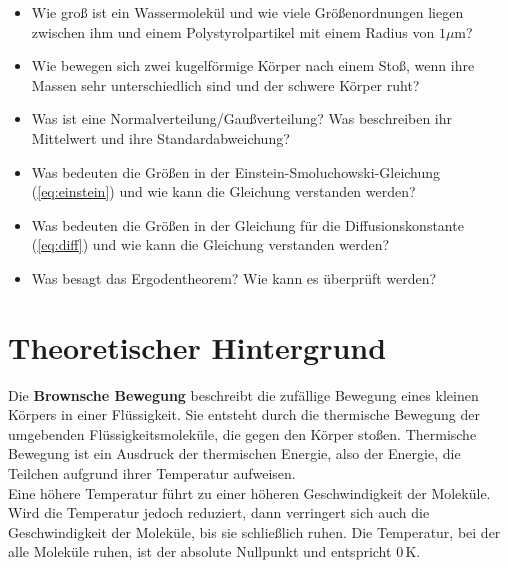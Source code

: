 \documentclass[a4paper, 12pt]{scrartcl}
\begin{document}
\begin{itemize}
  \item Wie groß ist ein Wassermolekül und wie viele Größenordnungen liegen zwischen ihm und einem Polystyrolpartikel mit einem Radius von $1 \mu$m?
  \item Wie bewegen sich zwei kugelförmige Körper nach einem Stoß, wenn ihre Massen sehr unterschiedlich sind und der schwere Körper ruht?
  \item Was ist eine Normalverteilung/Gaußverteilung? Was beschreiben ihr Mittelwert und ihre Standardabweichung?
  \item Was bedeuten die Größen in der Einstein-Smoluchowski-Gleichung (\ref{eq:einstein}) und wie kann die Gleichung verstanden werden?
  \item Was bedeuten die Größen in der Gleichung für die Diffusionskonstante (\ref{eq:diff}) und wie kann die Gleichung verstanden werden?
  \item Was besagt das Ergodentheorem? Wie kann es überprüft werden?
\end{itemize}

\section*{Theoretischer Hintergrund}

Die \textbf{Brownsche Bewegung} beschreibt die zufällige Bewegung eines kleinen Körpers in einer Flüssigkeit. Sie entsteht durch die thermische Bewegung der umgebenden Flüssigkeitsmoleküle, die gegen den Körper stoßen.
Thermische Bewegung ist ein Ausdruck der thermischen Energie, also der Energie, die Teilchen aufgrund ihrer Temperatur aufweisen.\\
Eine höhere Temperatur führt zu einer höheren Geschwindigkeit der Moleküle. Wird die Temperatur jedoch reduziert, dann verringert sich auch die Geschwindigkeit der Moleküle, bis sie schließlich ruhen. Die Temperatur, bei der alle Moleküle ruhen, ist der absolute Nullpunkt und entspricht $0 \,$K.\\
\end{document}
